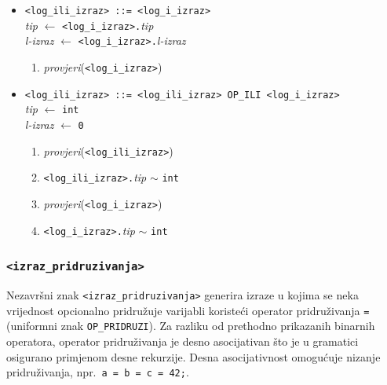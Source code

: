 \documentclass[times, 12pt, utf8]{book}
\begin{document}
\begin{itemize}

\item
\verb|<log_ili_izraz> ::= <log_i_izraz>|\\
\emph{tip} \(\leftarrow\) \verb|<log_i_izraz>.|\emph{tip}\\
\emph{l-izraz} \(\leftarrow\) \verb|<log_i_izraz>.|\emph{l-izraz}
\begin{enumerate}
\item
\emph{provjeri}(\verb|<log_i_izraz>|)
\end{enumerate}

\item
\verb#<log_ili_izraz> ::= <log_ili_izraz> OP_ILI <log_i_izraz>#\\
\emph{tip} \(\leftarrow\) \verb|int|\\
\emph{l-izraz} \(\leftarrow\) \verb|0|
\begin{enumerate}
\item
\emph{provjeri}(\verb|<log_ili_izraz>|)
\item
\verb|<log_ili_izraz>.|\emph{tip} \(\sim\) \verb|int|
\item
\emph{provjeri}(\verb|<log_i_izraz>|)
\item
\verb|<log_i_izraz>.|\emph{tip} \(\sim\) \verb|int|
\end{enumerate}

\end{itemize}

\subsubsection{\texttt{<izraz\_pridruzivanja>}}

Nezavršni znak \verb|<izraz_pridruzivanja>| generira izraze u kojima se neka vrijednost opcionalno pridružuje varijabli koristeći operator pridruživanja \verb|=| (uniformni znak \verb|OP_PRIDRUZI|).
Za razliku od prethodno prikazanih binarnih operatora, operator pridruživanja je desno asocijativan što je u gramatici osigurano primjenom desne rekurzije.
Desna asocijativnost omogućuje nizanje pridruživanja, npr.~\verb|a = b = c = 42;|.
\end{document}
